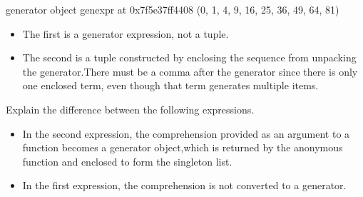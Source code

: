 \documentclass[letterpaper,10pt,english]{sphinxmanual}
\begin{document}
\begin{sphinxVerbatim}[commandchars=\\\{\}]
\PYGZlt{}generator object \PYGZlt{}genexpr\PYGZgt{} at 0x7f5e37ff4408\PYGZgt{}
(0, 1, 4, 9, 16, 25, 36, 49, 64, 81)
\end{sphinxVerbatim}
\begin{itemize}
\item {} 
The first is a generator expression, not a tuple.

\item {} 
The second is a tuple constructed by enclosing the sequence from unpacking the generator.There must be a comma after the generator since there is only one enclosed term, even though that term generates multiple items.

\end{itemize}

 Explain the difference between the following expressions.

\begin{sphinxVerbatim}[commandchars=\\\{\}]
\PYG{p}{[}    \PYG{p}{]}
      \PYG{p}{[}      \PYG{p}{]} 
\end{sphinxVerbatim}

\begin{sphinxVerbatim}
\end{sphinxVerbatim}
\begin{itemize}
\item {} 
In the second expression, the comprehension provided as an argument to a function becomes a generator object,which is returned by the anonymous function and enclosed to form the singleton list.

\item {} 
In the first expression, the comprehension is not converted to a generator.

\end{itemize}
\end{document}
